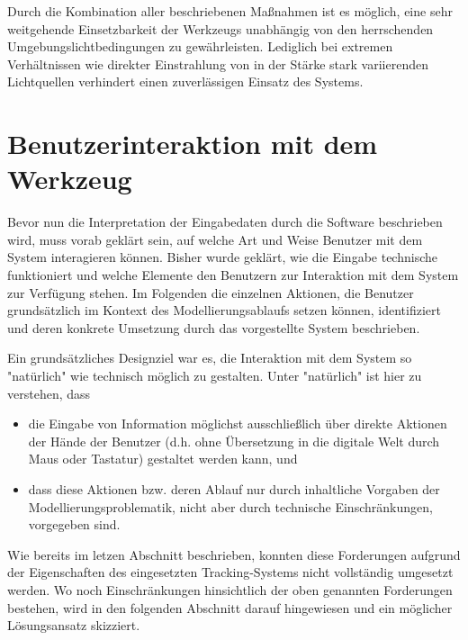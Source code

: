 Durch die Kombination aller beschriebenen Maßnahmen ist es möglich, eine sehr weitgehende Einsetzbarkeit der Werkzeugs unabhängig von den herrschenden Umgebungslichtbedingungen zu gewährleisten. Lediglich bei extremen Verhältnissen wie direkter Einstrahlung von in der Stärke stark variierenden Lichtquellen verhindert einen zuverlässigen Einsatz des Systems.  


\section{Benutzerinteraktion mit dem Werkzeug} %
\label{sec:benutzerinteraktion_mit_dem_werkzeug}

Bevor nun die Interpretation der Eingabedaten durch die Software beschrieben wird, muss vorab geklärt sein, auf welche Art und Weise Benutzer mit dem System interagieren können. Bisher wurde geklärt, wie die Eingabe technische funktioniert und welche Elemente den Benutzern zur Interaktion mit dem System zur Verfügung stehen. Im Folgenden die einzelnen Aktionen, die Benutzer grundsätzlich im Kontext des Modellierungsablaufs setzen können, identifiziert und deren konkrete Umsetzung durch das vorgestellte System beschrieben.

Ein grundsätzliches Designziel war es, die Interaktion mit dem System so "natürlich" wie technisch möglich zu gestalten. Unter "natürlich" ist hier zu verstehen, dass 
\begin{itemize}
	\item die Eingabe von Information möglichst ausschließlich über direkte Aktionen der Hände der Benutzer (d.h. ohne Übersetzung in die digitale Welt durch Maus oder Tastatur) gestaltet werden kann, und
	\item dass diese Aktionen bzw. deren Ablauf nur durch inhaltliche Vorgaben der Modellierungsproblematik, nicht aber durch technische Einschränkungen, vorgegeben sind.
\end{itemize}
Wie bereits im letzen Abschnitt beschrieben, konnten diese Forderungen aufgrund der Eigenschaften des eingesetzten Tracking-Systems nicht vollständig umgesetzt werden. Wo noch Einschränkungen hinsichtlich der oben genannten Forderungen bestehen, wird in den folgenden Abschnitt darauf hingewiesen und ein möglicher Lösungsansatz skizziert.

